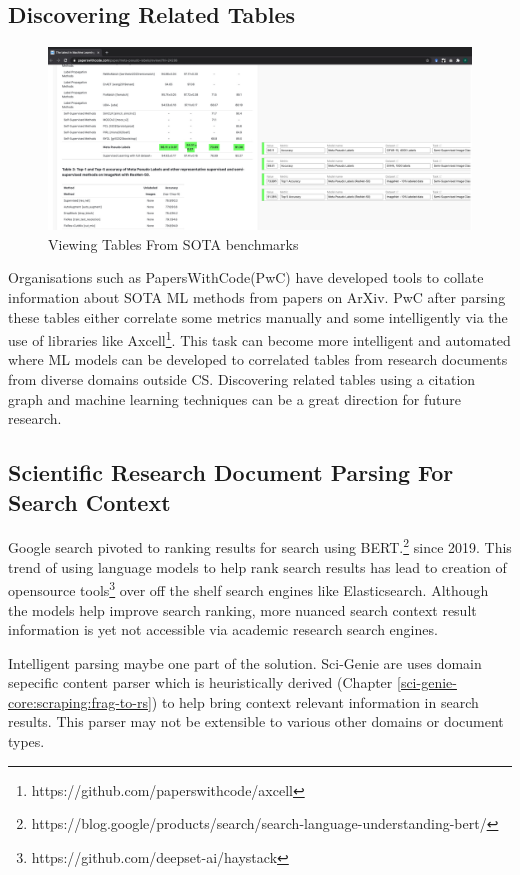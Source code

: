 \subsection{Discovering Related Tables}
\begin{figure}[h]
    \centering
    \includegraphics[width=\maxwidth{\textwidth}]{src/images/pwc-table-exp.pdf}
    \caption{ Viewing Tables From SOTA benchmarks }
    \label{figure\arabic{figurecounter}}
\end{figure}
Organisations such as PapersWithCode(PwC) have developed tools to collate information about SOTA ML methods from papers on ArXiv. PwC after parsing these tables either correlate some metrics manually and some intelligently via the use of libraries like Axcell\footnote{https://github.com/paperswithcode/axcell}. This task can become more intelligent and automated where ML models can be developed to correlated tables from research documents from diverse domains outside CS. Discovering related tables using a citation graph and machine learning techniques can be a great direction for future research. 

\subsection{Scientific Research Document Parsing For Search Context}
Google search pivoted to ranking results for search using BERT.\footnote{https://blog.google/products/search/search-language-understanding-bert/} since 2019. This trend of using language models to help rank search results has lead to creation of opensource tools\footnote{https://github.com/deepset-ai/haystack} over off the shelf search engines like Elasticsearch. Although the models help improve search ranking, more nuanced search context result information is yet not accessible via academic research search engines. 

Intelligent parsing maybe one part of the solution. Sci-Genie are uses domain sepecific content parser which is heuristically derived (Chapter \ref{sci-genie-core:scraping:frag-to-rs}) to help bring context relevant information in search results. This parser may not be extensible to various other domains or document types.

